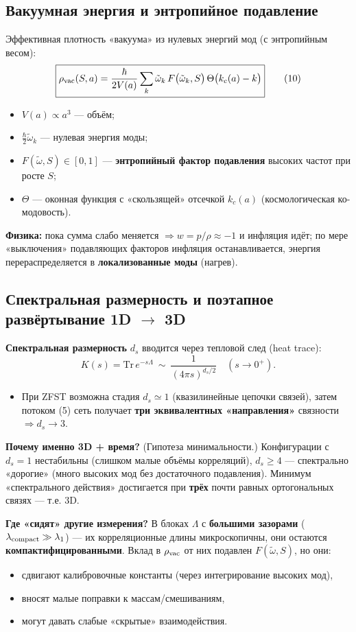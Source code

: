 \documentclass[12pt,a4paper]{article}
\begin{document}
\subsection{Вакуумная энергия и энтропийное подавление}
Эффективная плотность «вакуума» из нулевых энергий мод (с энтропийным весом):
\[
\boxed{\rho_{\rm vac}(S,a) = \frac{\hbar}{2 V(a)} \sum_k \tilde{\omega}_k \, F \big( \tilde{\omega}_k, S \big) \, \Theta \big( k_c(a) - k \big)} \tag{10}
\]
\begin{itemize}
    \item \(V(a) \propto a^3\) — объём;
    \item \(\frac{\hbar}{2} \tilde{\omega}_k\) — нулевая энергия моды;
    \item \(F(\tilde{\omega},S) \in [0,1]\) — \textbf{энтропийный фактор подавления} высоких частот при росте \(S\);
    \item \(\Theta\) — оконная функция с «скользящей» отсечкой \(k_c(a)\) (космологическая ко-модовость).
\end{itemize}

\textbf{Физика:} пока сумма слабо меняется \(\Rightarrow w = p/\rho \approx -1\) и инфляция идёт; по мере «выключения» подавляющих факторов инфляция останавливается, энергия перераспределяется в \textbf{локализованные моды} (нагрев).

\subsection{Спектральная размерность и поэтапное развёртывание 1D \(\to\) 3D}
\textbf{Спектральная размерность} \(d_s\) вводится через тепловой след (heat trace):
\[
K(s) = \mathrm{Tr} \, e^{-s \Lambda} \ \sim \ \frac{1}{(4\pi s)^{d_s/2}} \quad (s \to 0^+). \tag{11}
\]
\begin{itemize}
    \item При ZFST возможна стадия \(d_s \simeq 1\) (квазилинейные цепочки связей), затем потоком (5) сеть получает \textbf{три эквивалентных «направления»} связности \(\Rightarrow d_s \to 3\).
\end{itemize}

\textbf{Почему именно 3D + время?}  
(Гипотеза минимальности.) Конфигурации с \(d_s = 1\) нестабильны (слишком малые объёмы корреляций), \(d_s \ge 4\) — спектрально «дорогие» (много высоких мод без достаточного подавления). Минимум «спектрального действия» достигается при \textbf{трёх} почти равных ортогональных связях — т.е. 3D.

\textbf{Где «сидят» другие измерения?}  
В блоках \(\Lambda\) с \textbf{большими зазорами} (\(\lambda_{\rm compact} \gg \lambda_1\)) — их корреляционные длины микроскопичны, они остаются \textbf{компактифицированными}. Вклад в \(\rho_{\rm vac}\) от них подавлен \(F(\tilde{\omega},S)\), но они:
\begin{itemize}
    \item сдвигают калибровочные константы (через интегрирование высоких мод),
    \item вносят малые поправки к массам/смешиваниям,
    \item могут давать слабые «скрытые» взаимодействия.
\end{itemize}
\end{document}
